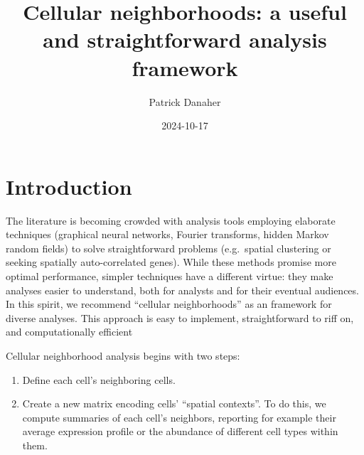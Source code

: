 \documentclass[
  letterpaper,
  DIV=11,
  numbers=noendperiod]{scrartcl}
\title{Cellular neighborhoods: a useful and straightforward analysis
framework}
\author{Patrick Danaher}
\date{2024-10-17}
\providecommand{\tightlist}{%
  \setlength{\itemsep}{0pt}\setlength{\parskip}{0pt}}\usepackage{longtable,booktabs,array}
\renewcommand*\contentsname{Table of contents}
\newcommand\contentsname{Table of contents}
\begin{document}
\maketitle
\ifdefined\Shaded\renewenvironment{Shaded}{\begin{tcolorbox}[enhanced, interior hidden, borderline west={3pt}{0pt}{shadecolor}, sharp corners, boxrule=0pt, frame hidden, breakable]}{\end{tcolorbox}}\fi

\renewcommand*\contentsname{Contents}
{
\hypersetup{linkcolor=}
\setcounter{tocdepth}{3}
\tableofcontents
}
\hypertarget{introduction}{%
\section{Introduction}\label{introduction}}

The literature is becoming crowded with analysis tools employing
elaborate techniques (graphical neural networks, Fourier transforms,
hidden Markov random fields) to solve straightforward problems
(e.g.~spatial clustering or seeking spatially auto-correlated genes).
While these methods promise more optimal performance, simpler techniques
have a different virtue: they make analyses easier to understand, both
for analysts and for their eventual audiences. In this spirit, we
recommend ``cellular neighborhoods'' as an framework for diverse
analyses. This approach is easy to implement, straightforward to riff
on, and computationally efficient

Cellular neighborhood analysis begins with two steps:

\begin{enumerate}
\def\labelenumi{\arabic{enumi}.}
\tightlist
\item
  Define each cell's neighboring cells.
\item
  Create a new matrix encoding cells' ``spatial contexts''. To do this,
  we compute summaries of each cell's neighbors, reporting for example
  their average expression profile or the abundance of different cell
  types within them.
\end{enumerate}
\end{document}
